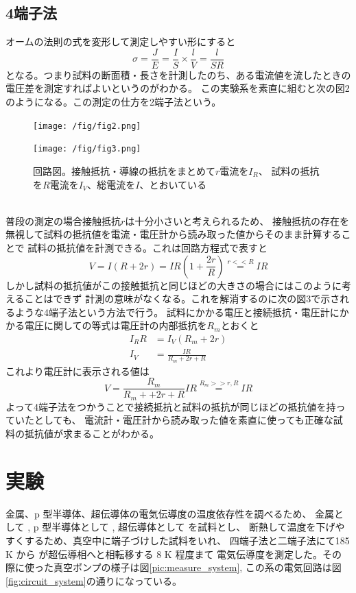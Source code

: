 \documentclass[11pt,dvipdfmx,a4paper]{jsarticle}
\begin{document}
\subsection*{4端子法}
オームの法則の式を変形して測定しやすい形にすると
\begin{equation}
  \sigma = \frac{J}{E} = \frac{I}{S} \times \frac{l}{V} = \frac{l}{SR}
\end{equation}
となる。つまり試料の断面積・長さを計測したのち、ある電流値を流したときの電圧差を測定すればよいというのがわかる。
この実験系を素直に組むと次の図2のようになる。この測定の仕方を2端子法という。
\begin{figure}[h]
  \centering
  \begin{minipage}[t]{0.49\columnwidth}
    \texttt{[image: /fig/fig2.png]}
  \end{minipage}
  \begin{minipage}[t]{0.49\columnwidth}
    \texttt{[image: /fig/fig3.png]}
  \end{minipage}
  \caption{回路図。接触抵抗・導線の抵抗をまとめて$r$電流を$I_R$、
  試料の抵抗を$R$電流を$I_V$、総電流を$I$、とおいている}
\end{figure}\\
普段の測定の場合接触抵抗\(r\)は十分小さいと考えられるため、
接触抵抗の存在を無視して試料の抵抗値を電流・電圧計から読み取った値からそのまま計算することで
試料の抵抗値を計測できる。これは回路方程式で表すと
\begin{equation}
  V=I(R+2r)=IR(1+\frac{2r}{R}) \stackrel{r<<R}{=} IR
\end{equation}
しかし試料の抵抗値がこの接触抵抗と同じほどの大きさの場合にはこのように考えることはできず
計測の意味がなくなる。これを解消するのに次の図3で示されるような4端子法という方法で行う。
試料にかかる電圧と接続抵抗・電圧計にかかる電圧に関しての等式は電圧計の内部抵抗を$R_m$とおくと
\begin{align}
  I_R R &= I_V (R_m + 2r)\\
  I_V &= \frac{IR}{R_m + 2r + R}
\end{align}
これより電圧計に表示される値は
\begin{equation}
  V=\frac{R_m}{R_m+ +2r + R} IR \stackrel{R_m>>r,R}{=} IR
\end{equation}
よって4端子法をつかうことで接続抵抗と試料の抵抗が同じほどの抵抗値を持っていたとしても、
電流計・電圧計から読み取った値を素直に使っても正確な試料の抵抗値が求まることがわかる。

\section{実験}
金属、p 型半導体、超伝導体の電気伝導度の温度依存性を調べるため、
金属として , p 型半導体として , 超伝導体として  を試料とし、
断熱して温度を下げやすくするため、真空中に端子づけした試料をいれ、
四端子法と二端子法にて185 K から  が超伝導相へと相転移する 8 K 程度まて
電気伝導度を測定した。その際に使った真空ポンプの様子は図\ref{pic:measure_system},
この系の電気回路は図\ref{fig:circuit_system}の通りになっている。
\end{document}
